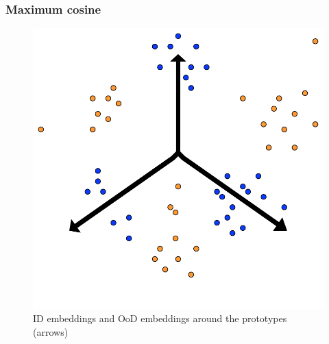 \documentclass[]{beamer}
\begin{document}

\begin{frame} \frametitle{Maximum cosine}
\begin{figure}[H]
    \caption{{\color{blue} ID embeddings} and {\color{orange} OoD embeddings} around the prototypes (arrows)}
    \vspace{-8pt}
    \centering
    \includegraphics[scale=0.45]{circle.pdf}
\end{figure}
\end{frame}
\end{document}
